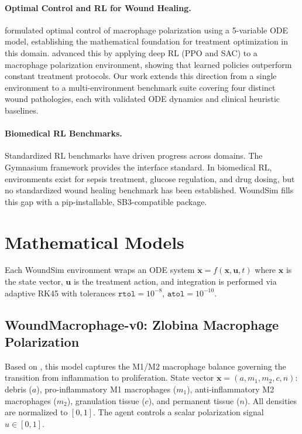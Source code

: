 \documentclass[11pt,a4paper]{article}
\begin{document}
\paragraph{Optimal Control and RL for Wound Healing.}
\citet{zlobina2022} formulated optimal control of macrophage polarization using a 5-variable ODE model, establishing the mathematical foundation for treatment optimization in this domain. \citet{lu2024} advanced this by applying deep RL (PPO and SAC) to a macrophage polarization environment, showing that learned policies outperform constant treatment protocols. Our work extends this direction from a single environment to a multi-environment benchmark suite covering four distinct wound pathologies, each with validated ODE dynamics and clinical heuristic baselines.

\paragraph{Biomedical RL Benchmarks.}
Standardized RL benchmarks have driven progress across domains. The Gymnasium framework \citep{gymnasium} provides the interface standard. In biomedical RL, environments exist for sepsis treatment, glucose regulation, and drug dosing, but no standardized wound healing benchmark has been established. WoundSim fills this gap with a pip-installable, SB3-compatible \citep{sb3} package.

\section{Mathematical Models}
\label{sec:models}

Each WoundSim environment wraps an ODE system $\dot{\mathbf{x}} = f(\mathbf{x}, \mathbf{u}, t)$ where $\mathbf{x}$ is the state vector, $\mathbf{u}$ is the treatment action, and integration is performed via adaptive RK45 with tolerances $\texttt{rtol}=10^{-8}$, $\texttt{atol}=10^{-10}$.

\subsection{WoundMacrophage-v0: Zlobina Macrophage Polarization}

Based on \citet{zlobina2022}, this model captures the M1/M2 macrophage balance governing the transition from inflammation to proliferation. State vector $\mathbf{x} = (a, m_1, m_2, c, n)$: debris ($a$), pro-inflammatory M1 macrophages ($m_1$), anti-inflammatory M2 macrophages ($m_2$), granulation tissue ($c$), and permanent tissue ($n$). All densities are normalized to $[0, 1]$. The agent controls a scalar polarization signal $u \in [0, 1]$.
\end{document}
